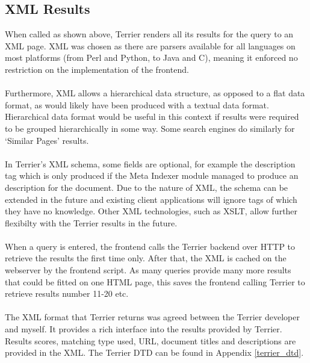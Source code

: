 \subsection{XML Results}
When called as shown above, Terrier renders all its results for the query to an XML page. XML was chosen as there are parsers available for all languages on most platforms (from Perl and Python, to Java and C), meaning it enforced no restriction on the implementation of the frontend.\\
\ \\
Furthermore, XML allows a hierarchical data structure, as opposed to a flat data format, as would likely have been produced with a textual data format. Hierarchical data format would be useful in this context if results were required to be grouped hierarchically in some way. Some search engines do similarly for `Similar Pages' results.\\
\ \\
In Terrier's XML schema, some fields are optional, for example the description tag which is only produced if the Meta Indexer module managed to produce an description for the document. Due to the nature of XML, the schema can be extended in the future and existing client applications will ignore tags of which they have no knowledge. Other XML technologies, such as XSLT, allow further flexibilty with the Terrier results in the future.\\
\ \\
When a query is entered, the frontend calls the Terrier backend over HTTP to retrieve the results the first time only. After that, the XML is cached on the webserver by the frontend script. As many queries provide many more results that could be fitted on one HTML page, this saves the frontend calling Terrier to retrieve results number 11-20 etc.\\
\ \\
The XML format that Terrier returns was agreed between the Terrier developer and myself. It provides a rich interface into the results provided by Terrier. Results scores, matching type used, URL, document titles and descriptions are provided in the XML. The Terrier DTD can be found in Appendix \ref{terrier_dtd}.\\

